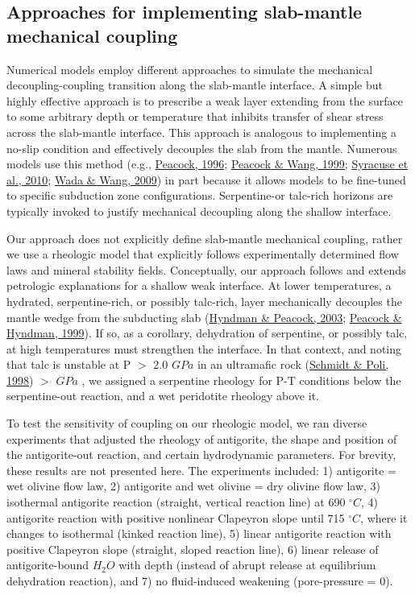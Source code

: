 \documentclass[draft,linenumbers]{agujournal2018}
\begin{document}
\hypertarget{approaches-for-implementing-slab-mantle-mechanical-coupling}{%
\subsection{Approaches for implementing slab-mantle mechanical
coupling}\label{approaches-for-implementing-slab-mantle-mechanical-coupling}}

Numerical models employ different approaches to simulate the mechanical
decoupling-coupling transition along the slab-mantle interface. A simple
but highly effective approach is to prescribe a weak layer extending
from the surface to some arbitrary depth or temperature that inhibits
transfer of shear stress across the slab-mantle interface. This approach
is analogous to implementing a no-slip condition and effectively
decouples the slab from the mantle. Numerous models use this method
(e.g., \protect\hyperlink{ref-Peacock1996}{Peacock, 1996};
\protect\hyperlink{ref-Peacock1999b}{Peacock \& Wang, 1999};
\protect\hyperlink{ref-Syracuse2010}{Syracuse et al., 2010};
\protect\hyperlink{ref-Wada2009}{Wada \& Wang, 2009}) in part because it
allows models to be fine-tuned to specific subduction zone
configurations. Serpentine-or talc-rich horizons are typically invoked
to justify mechanical decoupling along the shallow interface.

Our approach does not explicitly define slab-mantle mechanical coupling,
rather we use a rheologic model that explicitly follows experimentally
determined flow laws and mineral stability fields. Conceptually, our
approach follows and extends petrologic explanations for a shallow weak
interface. At lower temperatures, a hydrated, serpentine-rich, or
possibly talc-rich, layer mechanically decouples the mantle wedge from
the subducting slab (\protect\hyperlink{ref-Hyndman2003}{Hyndman \&
Peacock, 2003}; \protect\hyperlink{ref-Peacock1999a}{Peacock \& Hyndman,
1999}). If so, as a corollary, dehydration of serpentine, or possibly
talc, at high temperatures must strengthen the interface. In that
context, and noting that talc is unstable at P \(>\) 2.0 \(GPa\) in an
ultramafic rock (\protect\hyperlink{ref-Schmidt1998}{Schmidt \& Poli,
1998}) \(>\) \(GPa\) , we assigned a serpentine rheology for P-T
conditions below the serpentine-out reaction, and a wet peridotite
rheology above it.

To test the sensitivity of coupling on our rheologic model, we ran
diverse experiments that adjusted the rheology of antigorite, the shape
and position of the antigorite-out reaction, and certain hydrodynamic
parameters. For brevity, these results are not presented here. The
experiments included: 1) antigorite = wet olivine flow law, 2)
antigorite and wet olivine = dry olivine flow law, 3) isothermal
antigorite reaction (straight, vertical reaction line) at 690
\(^{\circ}C\), 4) antigorite reaction with positive nonlinear Clapeyron
slope until 715 \(^{\circ}C\), where it changes to isothermal (kinked
reaction line), 5) linear antigorite reaction with positive Clapeyron
slope (straight, sloped reaction line), 6) linear release of
antigorite-bound \(H_{2}O\) with depth (instead of abrupt release at
equilibrium dehydration reaction), and 7) no fluid-induced weakening
(pore-pressure = 0).
\end{document}
